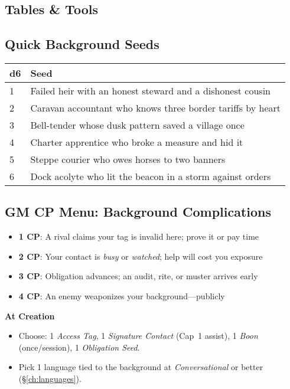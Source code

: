 \begin{multicols}{2}
\section{Tables \& Tools}

\subsection*{Quick Background Seeds}
\small
\begin{tabular}{ll}
\toprule
d6 & Seed \\
\midrule
1 & Failed heir with an honest steward and a dishonest cousin \\
2 & Caravan accountant who knows three border tariffs by heart \\
3 & Bell-tender whose dusk pattern saved a village once \\
4 & Charter apprentice who broke a measure and hid it \\
5 & Steppe courier who owes horses to two banners \\
6 & Dock acolyte who lit the beacon in a storm against orders \\
\bottomrule
\end{tabular}
\normalsize

\subsection*{GM CP Menu: Background Complications}
\begin{itemize}
\item \textbf{1 CP}: A rival claims your tag is invalid here; prove it or pay time
\item \textbf{2 CP}: Your contact is \emph{busy} or \emph{watched}; help will cost you exposure
\item \textbf{3 CP}: Obligation advances; an audit, rite, or muster arrives early
\item \textbf{4 CP}: An enemy weaponizes your background—publicly
\end{itemize}

\begin{tcolorbox}[colback=blue!5!white,colframe=blue!75!black,title=Background Quick Reference,fonttitle=\bfseries]
\textbf{At Creation}
\begin{itemize}
\item Choose: 1 \emph{Access Tag}, 1 \emph{Signature Contact} (Cap~1 assist), 1 \emph{Boon} (once/session), 1 \emph{Obligation Seed}.
\item Pick 1 language tied to the background at \emph{Conversational} or better (\S\ref{ch:languages}).
\end{itemize}


\end{tcolorbox}
\end{multicols}
